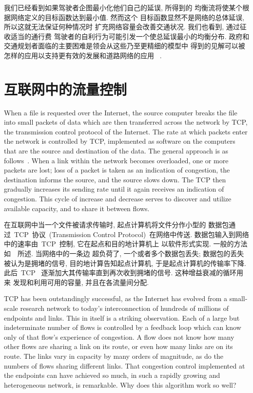 \documentclass[a4paper,12pt, twocolumn]{article}
\begin{document}
我们已经看到如果驾驶者企图最小化他们自己的延误, 所得到的
均衡流将使某个根据网络定义的目标函数达到最小值. 然而这个
目标函数显然不是网络的总体延误, 所以这就无法保证何种情况时
扩充网络容量会改善交通状况. 我们也看到, 通过征收适当的通行费
驾驶者的自利行为可能引发一个使总延误最小的均衡分布. 
政府和交通规划者面临的主要困难是领会从这些乃至更精细的模型中
得到的见解可以被怎样的应用以支持更有效的发展和道路网络的应用
~\cite{DfT}. 

\section{互联网中的流量控制}

When a file is requested over the Internet, the source computer
breaks the file into small 
packets of data which 
are then transferred across the network by TCP, the 
transmission control protocol of the Internet.  
The rate at which packets enter the network is
controlled by TCP, 
implemented as software on the computers 
that are the
source and destination of the data.
The general approach is as follows~\cite{JAC}.
When a link within the network becomes overloaded,
one or more packets are lost; loss of a packet is taken as an
indication of congestion, the destination informs the source,
and the source slows down. The TCP then
gradually increases its sending rate until it again receives an
indication of congestion. This cycle of increase and decrease serves
to discover and utilize available capacity, and to share
it between flows. 

在互联网中当一个文件被请求传输时, 起点计算机将文件分作小型的
数据包通过~TCP~协议~(Transmission Control Protocol)~在网络中传送. 
数据包输入到网络中的速率由~TCP~控制, 它在起点和目的地计算机上
以软件形式实现. 一般的方法如~\cite{JAC}~所述. 当网络中的一条边
超负荷了, 一个或者多个数据包丢失; 数据包的丢失被认为是拥堵的信号, 
目的地计算告知起点计算机, 于是起点计算机的传输率下降. 此后~TCP~
逐渐加大其传输率直到再次收到拥堵的信号. 这种增益衰减的循环用来
发现和利用可用的容量, 并且在各流量间分配. 

TCP has been outstandingly successful, 
as the Internet has evolved from a small-scale research network
to today's interconnection of hundreds of millions of endpoints and
links. This in itself is a striking observation.
Each of a large but indeterminate
number of flows is controlled by a feedback loop which
can know only of that flow's experience of congestion.
A flow does not know how many other flows are sharing 
a link on its route, or even how many links are on its route.
The links vary in capacity by many orders of 
magnitude, as do the numbers of flows sharing different links.
That congestion control implemented at the endpoints
can have achieved so much, in such a rapidly growing and 
heterogeneous network, is remarkable.
Why does this algorithm work so well? 
\end{document}
